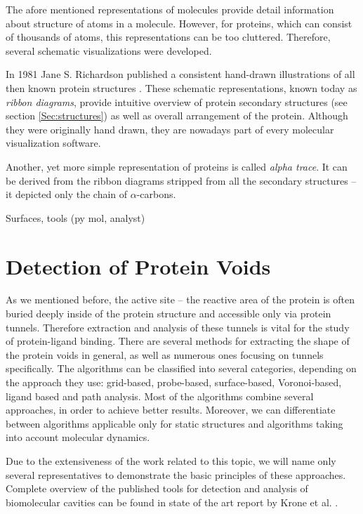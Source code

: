 The afore mentioned representations of molecules provide detail information about structure of atoms in a molecule. However, for proteins, which can consist of thousands of atoms, this representations can be too cluttered. Therefore, several schematic visualizations were developed. 

In 1981 Jane S. Richardson published a consistent hand-drawn illustrations of all then known protein structures \cite{richardson1981anatomy}. These schematic representations, known today as \textit{ribbon diagrams}, provide intuitive overview of protein secondary structures (see section \ref{Sec:structures}) as well as overall arrangement of the protein. Although they were originally hand drawn, they are nowadays part of every molecular visualization software.

Another, yet more simple representation of proteins is called \textit{alpha trace}. It can be derived from the ribbon diagrams stripped from all the secondary structures -- it depicted only the chain of $\alpha$-carbons.

Surfaces, tools (py mol, analyst)

\section{Detection of Protein Voids}
As we mentioned before, the active site -- the reactive area of the protein is often buried deeply inside of the protein structure and accessible only via protein tunnels. Therefore extraction and analysis of these tunnels is vital for the study of protein-ligand binding. There are several methods for extracting the shape of the protein voids in general, as well as numerous ones focusing on tunnels specifically. The algorithms can be classified into several categories, depending on the approach they use: grid-based, probe-based, surface-based, Voronoi-based, ligand based and path analysis. Most of the algorithms combine several approaches, in order to achieve better results. Moreover, we can differentiate  between algorithms applicable only for static structures and algorithms taking into account molecular dynamics.

Due to the extensiveness of the work related to this topic, we will name only several representatives to demonstrate the basic principles of these approaches. Complete overview of the published tools for detection and analysis of biomolecular cavities can be found in state of the art report by Krone et al. \cite{krone2016visual}.

